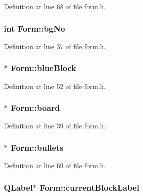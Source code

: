 Definition at line 68 of file form.h.\hypertarget{class_form_aec3ab393c4a0660c7b5fc7b7ece67d9a}{
\subsubsection[{bgNo}]{\setlength{\rightskip}{0pt plus 5cm}int {\bf Form::bgNo}}}
\label{class_form_aec3ab393c4a0660c7b5fc7b7ece67d9a}


Definition at line 37 of file form.h.\hypertarget{class_form_a4bf88e1480c496d5036499150432dff4}{
\subsubsection[{blueBlock}]{$\ast$ {\bf Form::blueBlock}}}
\label{class_form_a4bf88e1480c496d5036499150432dff4}


Definition at line 52 of file form.h.\hypertarget{class_form_a465e7b53a888759044031a0de6ede98d}{
\subsubsection[{board}]{$\ast$ {\bf Form::board}}}
\label{class_form_a465e7b53a888759044031a0de6ede98d}


Definition at line 39 of file form.h.\hypertarget{class_form_a19e48881d7309cc448166ecde55e1850}{
\subsubsection[{bullets}]{$\ast$ {\bf Form::bullets}}}
\label{class_form_a19e48881d7309cc448166ecde55e1850}


Definition at line 69 of file form.h.\hypertarget{class_form_abafd6277bf46fc8d802467c4aabea50e}{
\subsubsection[{currentBlockLabel}]{\setlength{\rightskip}{0pt plus 5cm}QLabel$\ast$ {\bf Form::currentBlockLabel}}}
\label{class_form_abafd6277bf46fc8d802467c4aabea50e}


